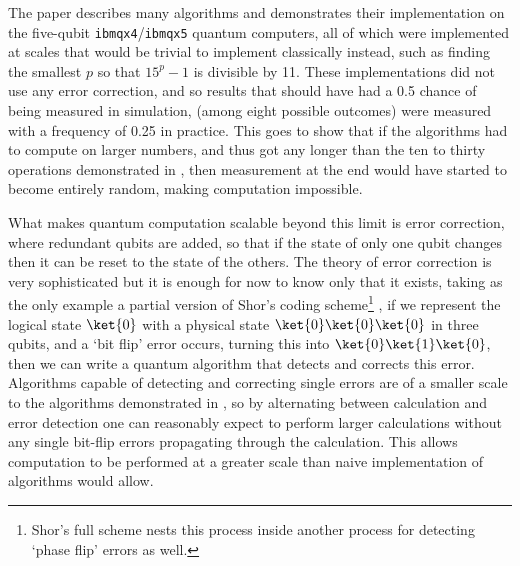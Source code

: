 The paper \cite{algos} describes many algorithms and demonstrates their implementation on the five-qubit \verb`ibmqx4`/\verb`ibmqx5` quantum computers, all of which were implemented at scales that would be trivial to implement classically instead, such as finding the smallest $p$ so that $15^p-1$ is divisible by 11. These implementations did not use any error correction, and so results that should have had a 0.5 chance of being measured in simulation, (among eight possible outcomes) were measured with a frequency of 0.25 in practice. This goes to show that if the algorithms had to compute on larger numbers, and thus got any longer than the ten to thirty operations demonstrated in \cite{algos}, then measurement at the end would have started to become entirely random, making computation impossible.

What makes quantum computation scalable beyond this limit is error correction, where redundant qubits are added, so that if the state of only one qubit changes then it can be reset to the state of the others. The theory of error correction is very sophisticated but it is enough for now to know only that it exists, taking as the only example a partial version of Shor's coding scheme\footnote{Shor's full scheme nests this process inside another process for detecting `phase flip' errors as well.} \cite{shor-encoding}, if we represent the logical state $\ket{0}$ with a physical state $\ket{0}\ket{0}\ket{0}$ in three qubits, and a `bit flip' error occurs, turning this into $\ket{0}\ket{1}\ket{0}$, then we can write a quantum algorithm that detects and corrects this error. Algorithms capable of detecting and correcting single errors are of a smaller scale to the algorithms demonstrated in \cite{algos}, so by alternating between calculation and error detection one can reasonably expect to perform larger calculations without any single bit-flip errors propagating through the calculation. This allows computation to be performed at a greater scale than naive implementation of algorithms would allow.

